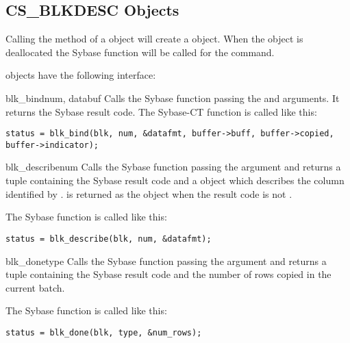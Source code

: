 \subsection{CS_BLKDESC Objects}

Calling the  method of a 
object will create a  object.  When the
 object is deallocated the Sybase
 function will be called for the command.

 objects have the following interface:

\begin{methoddesc}[CS_BLKDESC]{blk_bind}{num, databuf}
Calls the Sybase  function passing the 
and  arguments.  It returns the Sybase result code.  The
Sybase-CT  function is called like this:

\begin{verbatim}
status = blk_bind(blk, num, &datafmt, buffer->buff, buffer->copied, buffer->indicator);
\end{verbatim}
\end{methoddesc}

\begin{methoddesc}[CS_BLKDESC]{blk_describe}{num}
Calls the Sybase  function passing the
 argument and returns a tuple containing the Sybase result
code and a  object which describes the column
identified by .   is returned as the
 object when the result code is not
.

The Sybase  function is called like this:

\begin{verbatim}
status = blk_describe(blk, num, &datafmt);
\end{verbatim}
\end{methoddesc}

\begin{methoddesc}[CS_BLKDESC]{blk_done}{type}
Calls the Sybase  function passing the
 argument and returns a tuple containing the Sybase result
code and the number of rows copied in the current batch.

The Sybase  function is called like this:

\begin{verbatim}
status = blk_done(blk, type, &num_rows);
\end{verbatim}
\end{methoddesc}

